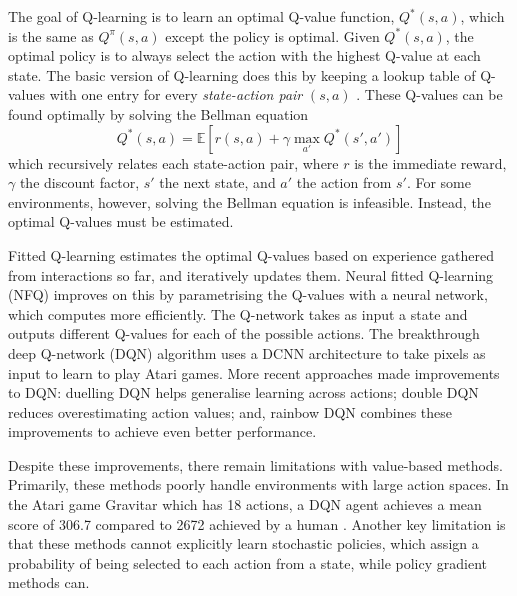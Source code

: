 \documentclass[12pt,a4paper]{article}
\begin{document}
The goal of Q-learning is to learn an optimal Q-value function, $Q^*(s,a)$, which is the same as $Q^{\pi}(s,a)$ except the policy is optimal. Given $Q^*(s,a)$, the optimal policy is to always select the action with the highest Q-value at each state. The basic version of Q-learning does this by keeping a lookup table of Q-values with one entry for every \emph{state-action pair} $(s,a)$ \cite{DBLP:journals/corr/abs-1811-12560}. These Q-values can be found optimally by solving the Bellman equation \cite{R-352-PR} $$Q^*(s,a) = \mathbb{E} \left[{r(s,a) + \gamma \underset{a'}{\max} Q^*(s',a')}\right]$$ which recursively relates each state-action pair, where $r$ is the immediate reward, $\gamma$ the discount factor, $s'$ the next state, and $a'$ the action from $s'$. For some environments, however, solving the Bellman equation is infeasible. Instead, the optimal Q-values must be estimated.

Fitted Q-learning \cite{10.5555/2998828.2998976} estimates the optimal Q-values based on experience gathered from interactions so far, and iteratively updates them. Neural fitted Q-learning (NFQ) \cite{10.1007/11564096_32} improves on this by parametrising the Q-values with a neural network, which computes more efficiently. The Q-network takes as input a state and outputs different Q-values for each of the possible actions. The breakthrough deep Q-network (DQN) algorithm \cite{Mnih2015} uses a DCNN architecture to take pixels as input to learn to play Atari games. More recent approaches made improvements to DQN: duelling DQN \cite{DBLP:journals/corr/WangFL15} helps generalise learning across actions; double DQN \cite{DBLP:journals/corr/HasseltGS15} reduces overestimating action values; and, rainbow DQN \cite{DBLP:journals/corr/abs-1710-02298} combines these improvements to achieve even better performance.

Despite these improvements, there remain limitations with value-based methods. Primarily, these methods poorly handle environments with large action spaces. In the Atari game Gravitar which has 18 actions, a DQN agent achieves a mean score of 306.7 compared to 2672 achieved by a human \cite{Mnih2015}. Another key limitation is that these methods cannot explicitly learn stochastic policies, which assign a probability of being selected to each action from a state, while policy gradient methods can.
\end{document}
